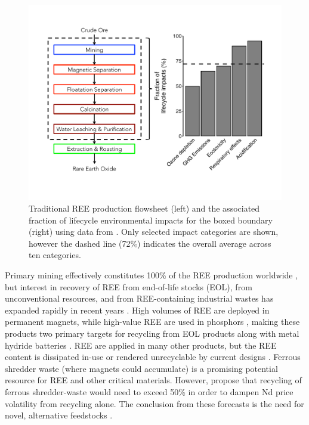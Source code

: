 \begin{figure}[htbp]
\begin{center}
\includegraphics[width = \textwidth]{Ch1_figures/Zaimes-LCA-schematic.pdf}
\caption{Traditional REE production flowsheet (left) and the associated fraction of lifecycle environmental impacts for the boxed boundary (right) using data from \citet{Zaimes_SCE_2015}.
Only selected impact categories are shown, however the dashed line (72\%) indicates the overall average across ten categories.}\label{fig:Zaimes-LCA}
\end{center}
\end{figure}

Primary mining effectively constitutes 100\% of the REE production worldwide \citep{Binnemans_JCP_2013, USGS_commsumm},
but interest in recovery of REE from end-of-life stocks (EOL), from unconventional resources, and from REE-containing industrial wastes has expanded rapidly in recent years \citep{Binnemans_JCP_2015}.
High volumes of REE are deployed in permanent magnets, while high-value REE are used in phosphors \citep{Hatch_Elem_2012},
making these products two primary targets for recycling from EOL products along with metal hydride batteries \citep{Binnemans_JCP_2013,Tunsu_Hydro_2015}.
REE are applied in many other products, but the REE content is dissipated in-use or rendered unrecyclable by current designs \citep{Ciacci_EST_2015}.
Ferrous shredder waste (where magnets could accumulate) is a promising potential resource for REE and other critical materials.
However, \citet{Bandara_JSM_2015} propose that recycling of ferrous shredder-waste would need to exceed 50\% in order to dampen Nd price volatility from recycling alone. The conclusion from these forecasts is the need for novel, alternative feedstocks \citep{Bandara_JSM_2015}.

